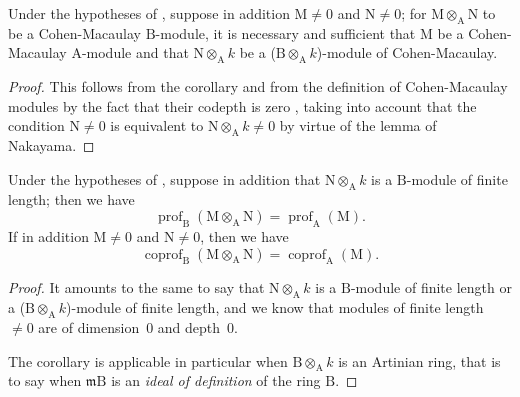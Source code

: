 \begin{corollary}[6.3.3]
\label{IV.6.3.3}
Under the hypotheses of , suppose in addition $\mathrm{M}\neq 0$ and $\mathrm{N}\neq 0$; for $\mathrm{M}\otimes_\mathrm{A}\mathrm{N}$ to be a Cohen-Macaulay $\mathrm{B}$-module, it is necessary and sufficient that $\mathrm{M}$ be a Cohen-Macaulay $\mathrm{A}$-module and that $\mathrm{N}\otimes_\mathrm{A} k$ be a ($\mathrm{B}\otimes_\mathrm{A} k$)-module of Cohen-Macaulay.
\end{corollary}

\begin{proof}
This follows from the corollary  and from the definition of Cohen-Macaulay modules by the fact that their codepth is zero , taking into account that the condition $\mathrm{N}\neq 0$ is equivalent to $\mathrm{N}\otimes_\mathrm{A} k\neq 0$ by virtue of the lemma of Nakayama.
\end{proof}

\begin{corollary}[6.3.4]
\label{IV.6.3.4}
Under the hypotheses of , suppose in addition that $\mathrm{N}\otimes_\mathrm{A} k$ is a $\mathrm{B}$-module of finite length; then we have
\begin{equation}
  \operatorname{prof}_\mathrm{B}(\mathrm{M}\otimes_\mathrm{A}\mathrm{N})=\operatorname{prof}_\mathrm{A}(\mathrm{M}).
  \label{IV.6.3.4.1}
\tag{6.3.4.1}
\end{equation}
If in addition $\mathrm{M}\neq 0$ and $\mathrm{N}\neq 0$, then we have
\begin{equation}
  \operatorname{coprof}_\mathrm{B}(\mathrm{M}\otimes_\mathrm{A}\mathrm{N})=\operatorname{coprof}_\mathrm{A}(\mathrm{M}).
  \label{IV.6.3.4.2}
\tag{6.3.4.2}
\end{equation}
\end{corollary}

\begin{proof}
It amounts to the same to say that $\mathrm{N}\otimes_\mathrm{A} k$ is a $\mathrm{B}$-module of finite length or a ($\mathrm{B}\otimes_\mathrm{A} k$)-module of finite length, and we know  that modules of finite length $\neq 0$ are of dimension~$0$ and depth~$0$.

The corollary  is applicable in particular when $\mathrm{B}\otimes_\mathrm{A} k$ is an Artinian ring, that is to say when $\mathfrak{m}\mathrm{B}$ is an \emph{ideal of definition} of the ring $\mathrm{B}$.
\end{proof}

